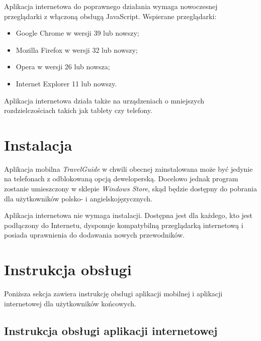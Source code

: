 \documentclass[a4paper]{book}
\newcommand{\appName}{\emph{TravelGuide} }
\begin{document}
		Aplikacja internetowa do poprawnego działania wymaga nowoczesnej przeglądarki z włączoną obsługą JavaScript. Wspierane przeglądarki:
		\begin{itemize}
			\item Google Chrome w wersji 39 lub nowszy;
			\item Mozilla Firefox w wersji 32 lub nowszy;
			\item Opera w wersji 26 lub nowsza;
			\item Internet Explorer 11 lub nowszy.
		\end{itemize}
		
		Aplikacja internetowa działa także na urządzeniach o mniejszych rozdzielczościach takich jak tablety czy telefony.
		
		\section{Instalacja}
		
		Aplikacja mobilna \appName w chwili obecnej zainstalowana może być jedynie na telefonach z odblokowaną opcją deweloperską. Docelowo jednak program zostanie umieszczony w sklepie \emph{Windows Store}, skąd będzie dostępny do pobrania dla użytkowników polsko- i angielskojęzycznych. 
		
		Aplikacja internetowa nie wymaga instalacji. Dostępna jest dla każdego, kto jest podłączony do Internetu, dysponuje kompatybilną przeglądarką internetową i posiada uprawnienia do dodawania nowych przewodników. 
	
	
		\section{Instrukcja obsługi}
		
		Poniższa sekcja zawiera instrukcję obsługi aplikacji mobilnej i aplikacji internetowej dla użytkowników końcowych. 
		
		\subsection{Instrukcja obsługi aplikacji internetowej}	
		
\end{document}
